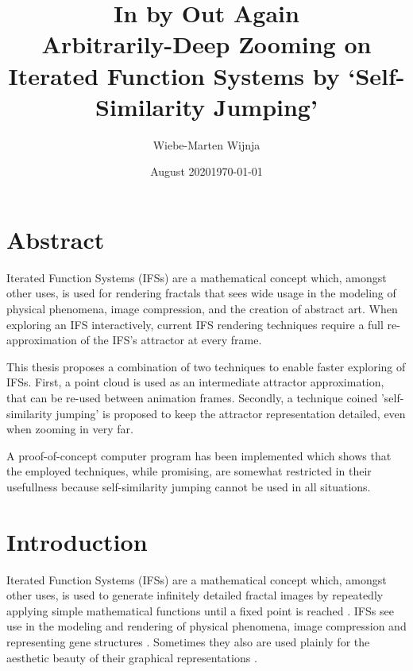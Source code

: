 \documentclass[11pt]{article}
\date{August 2020}
\author{Wiebe-Marten Wijnja}
\date{\today}
\title{\Huge In by Out Again\\\medskip
\large Arbitrarily-Deep Zooming on Iterated Function Systems by `Self-Similarity Jumping'}
\begin{document}
\maketitle
\setcounter{tocdepth}{4}
\tableofcontents

\listoftodos


\pagebreak

\section*{Abstract}
\label{sec:orgd88de45}
Iterated Function Systems (IFSs) are a mathematical concept which, amongst other uses, 
is used for rendering fractals that sees wide usage in the modeling of physical phenomena, 
image compression, and the creation of abstract art.
When exploring an IFS interactively, current IFS rendering techniques require a full re-approximation of the IFS's attractor at every frame.

This thesis proposes a combination of two techniques to enable faster exploring of IFSs.
First, a point cloud is used as an intermediate attractor approximation, that can be re-used between animation frames.
Secondly, a technique coined 'self-similarity jumping' is proposed to keep the attractor representation detailed, even when zooming in very far.

A proof-of-concept computer program has been implemented
which shows that the employed techniques, while promising, 
are somewhat restricted in their usefullness because self-similarity jumping cannot be used in all situations.

\pagebreak

\section{Introduction}
\label{sec:orgeaf20a7}

Iterated Function Systems (IFSs) are a mathematical concept which, amongst other uses, is used to generate infinitely detailed fractal images 
by repeatedly applying simple mathematical functions until a fixed point is reached \cite{barnsley1988fractals}. 
IFSs see use in the modeling and rendering of physical phenomena, image compression \cite{hart1996fractal} and representing gene structures \cite{jeffrey1990chaos}.
Sometimes they also are used plainly for the aesthetic beauty of their graphical representations \cite{draves2003fractal}.
\end{document}
